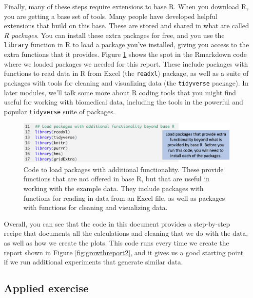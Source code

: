 \documentclass[]{tufte-book}
\begin{document}
Finally, many of these steps require extensions to base R. When you download R,
you are getting a base set of tools. Many people have developed helpful
extensions that build on this base. These are stored and shared in what are
called \emph{R packages}. You can install these extra packages for free, and you
use the \texttt{library} function in R to load a package you've installed, giving you
access to the extra functions that it provides. Figure
\ref{fig:growthloadpackage} shows the spot in the Rmarkdown code where we
loaded packages we needed for this report. These include packages with functions
to read data in R from Excel (the \texttt{readxl}) package, as well as a suite of
packages with tools for cleaning and visualizing data (the \texttt{tidyverse} package).
In later modules, we'll talk some more about R coding tools that you might find
useful for working with biomedical data, including the tools in the powerful and
popular \texttt{tidyverse} suite of packages.

\begin{figure}
\includegraphics[width=\textwidth]{figures/growth_curve_load_packages} \caption[Code to load packages with additional functionality]{Code to load packages with additional functionality. These provide functions that are not offered in base R, but that are useful in working with the example data. They include packages with functions for reading in data from an Excel file, as well as packages with functions for cleaning and visualizing data.}\label{fig:growthloadpackage}
\end{figure}

Overall, you can see that the code in this document provides a step-by-step
recipe that documents all the calculations and cleaning that we do with the
data, as well as how we create the plots. This code runs every time we create
the report shown in Figure \ref{fig:growthreport2}, and it gives us a good
starting point if we run additional experiments that generate similar data.

\subsection{Applied exercise}\label{applied-exercise}
\end{document}
